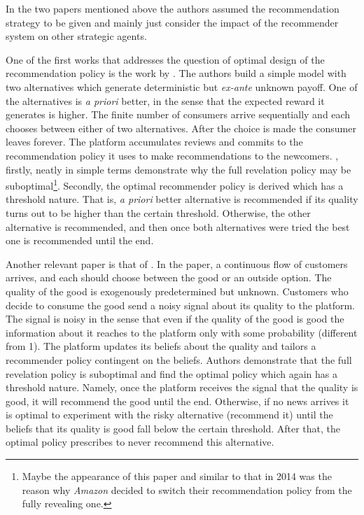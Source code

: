 \documentclass[a4paper]{article}
\begin{document}
In the two papers mentioned above the authors assumed the recommendation strategy to be given and mainly just consider the impact of the recommender system on other strategic agents. 

	
	
	
	One of the first works that addresses the question of optimal design of the recommendation policy is the work by \cite{kremer2014}. The authors build a simple model with two alternatives which generate deterministic but \textit{ex-ante} unknown payoff. One of the alternatives is \textit{a priori} better, in the sense that the expected reward it generates is higher. The finite number of consumers arrive sequentially and each chooses between either of two alternatives. After the choice is made the consumer leaves forever. The platform accumulates reviews and commits to the recommendation policy it uses to make recommendations to the newcomers. \cite{kremer2014}, firstly, neatly in simple terms demonstrate why the full revelation policy may be suboptimal\footnote{Maybe the appearance of this paper and similar to that in 2014 was the reason why \textit{Amazon} decided to switch their recommendation policy from the fully revealing one.}. Secondly, the optimal recommender policy is derived which has a threshold nature. That is, \textit{a priori} better alternative is recommended if its quality turns out to be higher than the certain threshold. Otherwise, the other alternative is recommended, and then once both alternatives were tried the best one is recommended until the end. 
	
	
	
	
	Another relevant paper is that of \cite{che2015}. In the paper, a continuous flow of customers arrives, and each should choose between the good or an outside option. The quality of the good is exogenously predetermined but unknown. Customers who decide to consume the good send a noisy signal about its quality to the platform. The signal is noisy in the sense that even if the quality of the good is good the information about it reaches to the platform only with some probability (different from 1). The platform updates its beliefs about the quality and tailors a recommender policy contingent on the beliefs. Authors demonstrate that the full revelation policy is suboptimal and find the optimal policy which again has a threshold nature. Namely, once the platform receives the signal that the quality is good, it will recommend the good until the end. Otherwise, if no news arrives it is optimal to experiment with the risky alternative (recommend it) until the beliefs that its quality is good fall below the certain threshold. After that, the optimal policy prescribes to never recommend this alternative.
	
\end{document}
